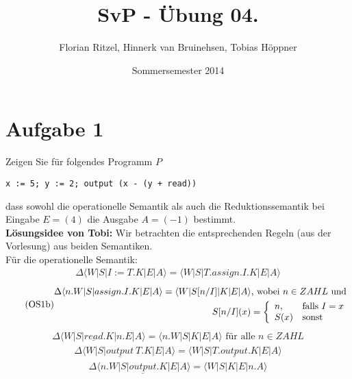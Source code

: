 \documentclass[ngerman,a4paper]{report}
\author{Florian Ritzel, Hinnerk van Bruinehsen, Tobias Höppner}
\title{SvP - Übung 04. }
\date{Sommersemester 2014}
\renewcommand{\maketitle}{}
\begin{document}
\maketitle
\section*{Aufgabe 1}
Zeigen Sie für folgendes Programm $P$
\begin{lstlisting}
x := 5; y := 2; output (x - (y + read))
\end{lstlisting}
dass sowohl die operationelle Semantik als auch die Reduktionssemantik bei Eingabe $E = (4)$ die Ausgabe $A = (-1)$ bestimmt.\\
\textbf{Lösungsidee von Tobi:}
Wir betrachten die entsprechenden Regeln (aus der Vorlesung) aus beiden Semantiken.\\
Für die operationelle Semantik:
\begin{equation}
\tag{OS1a}
\begin{split}
\Delta\langle W|S|I:=T.K|E|A\rangle = \langle W|S|T.assign.I.K|E|A\rangle
\end{split}
\label{eqn:os1a}
\end{equation}	
\begin{equation}
\tag{OS1b}
\begin{split}
  \Delta\langle n.W|S|assign.I.K|E|A\rangle = \langle W|S[n/I]|K|E|A\rangle\text{, wobei }n\in ZAHL\text{ und } \\ S[n/I](x) = \left\lbrace\begin{array}{l l}
n,&\text{falls }I =x\\
	S(x)& \text{sonst}\\
\end{array}\right.
\end{split}
\label{eqn:os1b}
\end{equation}	
\begin{equation}
\tag{OS2}
\begin{split}
\Delta\langle W|S|\underline{read}.K|n.E|A\rangle = \langle n.W|S|K|E|A\rangle\text{ für alle }n\in ZAHL
\end{split}
\label{eqn:os2}
\end{equation}	
\begin{equation}
\tag{OS3a}
\begin{split}
\Delta\langle W|S|\underline{output}\ T.K|E|A\rangle = \langle W|S|T.\underline{output}.K|E|A\rangle
\end{split}
\label{eqn:os3a}
\end{equation}		
\begin{equation}
\tag{OS3b}
\begin{split}
\Delta\langle n.W|S|\underline{output}.K|E|A\rangle = \langle W|S|K|E|n.A\rangle
\end{split}
\label{eqn:os3b}
\end{equation}	
\end{document}
